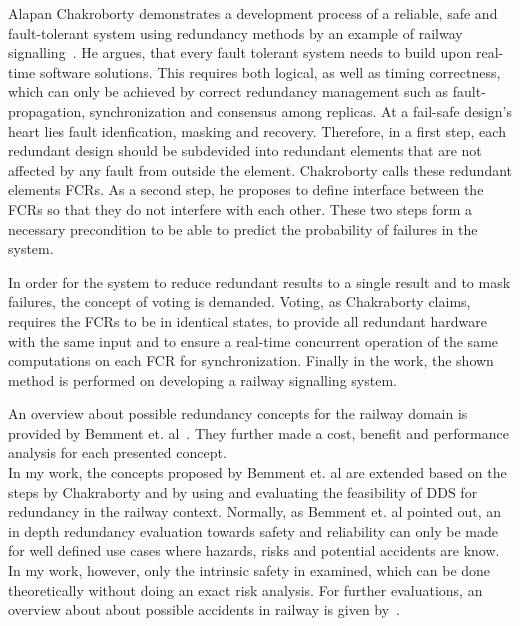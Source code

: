 Alapan Chakroborty demonstrates a development process of a reliable, safe and fault-tolerant system using redundancy methods by an example of railway signalling~\cite{ChakrabortyFaultTolerantRailway}.
He argues, that every fault tolerant system needs to build upon real-time software solutions.
This requires both logical, as well as timing correctness, which can only be achieved by correct redundancy management such as fault-propagation, synchronization and consensus among replicas.
At a fail-safe design's heart lies fault idenfication, masking and recovery.
Therefore, in a first step, each redundant design should be subdevided into redundant elements that are not affected by any fault from outside the element.
Chakroborty calls these redundant elements \glspl*{FCR}.
As a second step, he proposes to define interface between the \glspl*{FCR} so that they do not interfere with each other.
These two steps form a necessary precondition to be able to predict the probability of failures in the system.

In order for the system to reduce redundant results to a single result and to mask failures, the concept of voting is demanded.
Voting, as Chakraborty claims, requires the \glspl*{FCR} to be in identical states, to provide all redundant hardware with the same input and to ensure a real-time concurrent operation of the same computations on each \gls*{FCR} for synchronization.
Finally in the work, the shown method is performed on developing a railway signalling system.

An overview about possible redundancy concepts for the railway domain is provided by Bemment et. al~\cite{BemmentEvaluationOfRedundancy}.
They further made a cost, benefit and performance analysis for each presented concept.
\\

In my work, the concepts proposed by Bemment et. al are extended based on the steps by Chakraborty and by using and evaluating the feasibility of \gls*{DDS} for redundancy in the railway context.
Normally, as Bemment et. al pointed out, an in depth redundancy evaluation towards safety and reliability can only be made for well defined use cases where hazards, risks and potential accidents are know.
In my work, however, only the intrinsic safety in examined, which can be done theoretically without doing an exact risk analysis.
For further evaluations, an overview about about possible accidents in railway is given by~\cite{ERTMSRailwayAccidents}.
\\

